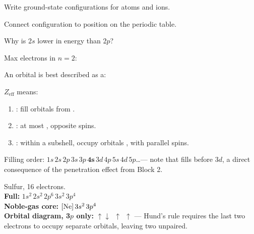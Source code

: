 \documentclass{apchem-notes}
\begin{document}

\begin{objectives}
  \item Write ground-state configurations for atoms and ions.
  \item Connect configuration to position on the periodic table.
\end{objectives}


\begin{warmup}[4]
  \item Why is 2$s$ lower in energy than 2$p$?
  \item Max electrons in $n = 2$: 
  \item An orbital is best described as a:
  \item $Z_{\text{eff}}$ means: 
\end{warmup}



\begin{enumerate}[leftmargin=*,itemsep=0.2em]
  \item {}: fill orbitals from
        .
  \item {}: at most ,
        opposite spins.
  \item {}: within a subshell, occupy orbitals
        , with parallel spins.
\end{enumerate}

Filling order: $1s\,2s\,2p\,3s\,3p\,\mathbf{4s}\,3d\,4p\,5s\,4d\,5p$\ldots ---
note that  fills before 3$d$, a direct consequence of
the penetration effect from Block 2.

\begin{workedexample}
Sulfur, 16 electrons.\\
\textbf{Full:} $1s^2\,2s^2\,2p^6\,3s^2\,3p^4$\\
\textbf{Noble-gas core:} $[\ce{Ne}]\,3s^2\,3p^4$\\
\textbf{Orbital diagram, 3$p$ only:}
$\uparrow\downarrow\ \ \uparrow\ \ \uparrow$ --- Hund's rule requires the
last two electrons to occupy separate orbitals, leaving two unpaired.
\end{workedexample}
\end{document}
